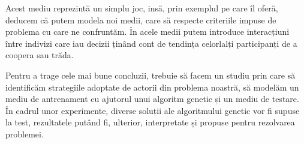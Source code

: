 Acest mediu reprezintă un simplu joc, insă, prin exemplul pe care îl oferă, deducem că putem modela noi medii, care să respecte criteriile impuse de problema cu care ne confruntăm. În acele medii putem introduce interacțiuni între indivizi care iau decizii ținând cont de tendința celorlalți participanți de a coopera sau trăda.

Pentru a trage cele mai bune concluzii, trebuie să facem un studiu prin care să identificăm strategiile adoptate de actorii din problema noastră, să modelăm un mediu de antrenament cu ajutorul unui algoritm genetic și un mediu de testare. În cadrul unor experimente, diverse soluții ale algoritmului genetic vor fi supuse la test, rezultatele putând fi, ulterior, interpretate și propuse pentru rezolvarea problemei.  


